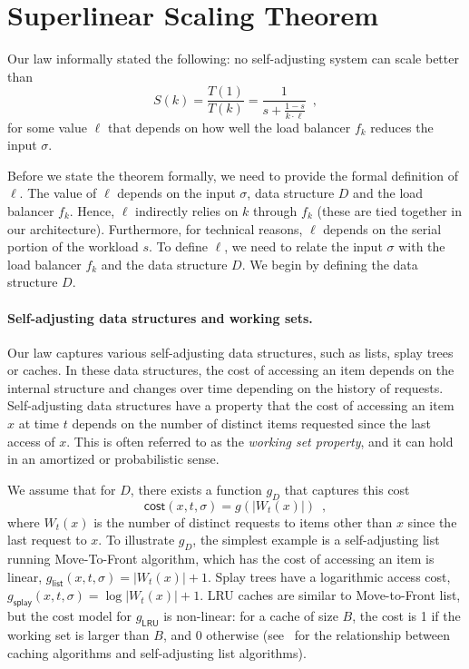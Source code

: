 \appendix





\section{Superlinear Scaling Theorem}

Our law informally stated the following: no self-adjusting system can scale better than
\begin{equation*}
  S(k) = \frac{T(1)}{T(k)} = \frac1{s + \frac{1-s}{k \cdot \ell}} \enspace ,
\end{equation*}
for some value $\ell$ that depends on how well the load balancer $f_k$ reduces the input $\sigma$.

Before we state the theorem formally, we need to provide the formal definition of $\ell$.
The value of $\ell$ depends on the input $\sigma$, data structure $D$ and the load balancer $f_k$. Hence, $\ell$ indirectly relies on $k$ through $f_k$ (these are tied together in our architecture). Furthermore, for technical reasons, $\ell$ depends on the serial portion of the workload $s$.
To define $\ell$, we need to relate the input $\sigma$ with the load balancer $f_k$ and the data structure $D$.
We begin by defining the data structure $D$.



\paragraph*{Self-adjusting data structures and working sets.}
Our law captures various self-adjusting data structures, such as lists, splay trees or caches.
In these data structures, the cost of accessing an item depends on the internal structure and changes over time depending on the history of requests.
Self-adjusting data structures have a property that the cost of accessing an item $x$ at time $t$ depends on the number of distinct items requested since the last access of $x$.
This is often referred to as the \emph{working set property}, and it can hold in an amortized or probabilistic sense.

We assume that for $D$, there exists a function $g_D$ that captures this cost
\[
	\textsf{cost}(x, t, \sigma) = g(|W_t(x)|) \enspace ,
\]
where $W_t(x)$ is the number of distinct requests to items other than $x$ since the last request to $x$.
To illustrate $g_D$, the simplest example is a self-adjusting list running Move-To-Front algorithm, which has the cost of accessing an item is linear, $g_\textsf{list}(x,t,\sigma) = |W_t(x)| + 1$. Splay trees have a logarithmic access cost, $g_\textsf{splay}(x,t,\sigma) = \log |W_t(x)| + 1$. LRU caches are similar to Move-to-Front list, but the cost model for $g_\textsf{LRU}$ is non-linear: for a cache of size $B$, the cost is 1 if the working set is larger than $B$, and 0 otherwise (see~\cite{SleatorT85} for the relationship between caching algorithms and self-adjusting list algorithms).

